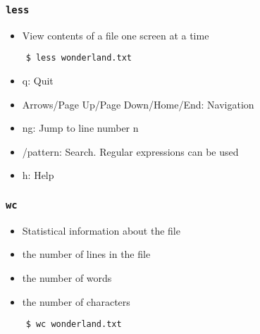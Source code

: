 \documentclass[12pt,compress]{beamer}
\newcounter{time}
\begin{document}
\begin{frame}[fragile]
  \frametitle{\texttt{less}}
  \begin{itemize}
  \item View contents of a file one screen at a time
  \end{itemize}

  \begin{lstlisting}
    $ less wonderland.txt
  \end{lstlisting} %

  \begin{itemize}
  \item q: Quit
  \item Arrows/Page Up/Page Down/Home/End: Navigation
  \item ng: Jump to line number n
  \item /pattern: Search. Regular expressions can be used
  \item h: Help
  \end{itemize}
\end{frame}

\begin{frame}[fragile]
  \frametitle{\texttt{wc}}
  \begin{itemize}
  \item Statistical information about the file
  \item the number of lines in the file
  \item the number of words 
  \item the number of characters
  \end{itemize}

  \begin{lstlisting}
    $ wc wonderland.txt
  \end{lstlisting} %
\end{frame}
\end{document}
